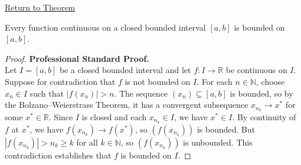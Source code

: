 \newpage
{}
\label{prf:boundedness-theorem}

\begin{remark*}[Return]
\hyperref[thm:boundedness-theorem]{Return to Theorem}
\end{remark*}

\begin{theorem*}
Every function continuous on a closed bounded interval $[a,b]$ is bounded on $[a,b]$.
\end{theorem*}

\begin{proof}
\textbf{Professional Standard Proof.}~\\
Let $I = [a,b]$ be a closed bounded interval and let $f : I \to \mathbb{R}$ be continuous on $I$. Suppose for contradiction that $f$ is not bounded on $I$. For each $n \in \mathbb{N}$, choose $x_n \in I$ such that $|f(x_n)| > n$. The sequence $(x_n) \subseteq [a,b]$ is bounded, so by the Bolzano--Weierstrass Theorem, it has a convergent subsequence $x_{n_k} \to x^*$ for some $x^* \in \mathbb{R}$. Since $I$ is closed and each $x_{n_k} \in I$, we have $x^* \in I$. By continuity of $f$ at $x^*$, we have $f(x_{n_k}) \to f(x^*)$, so $(f(x_{n_k}))$ is bounded. But $|f(x_{n_k})| > n_k \geq k$ for all $k \in \mathbb{N}$, so $(f(x_{n_k}))$ is unbounded. This contradiction establishes that $f$ is bounded on $I$.
\end{proof}

